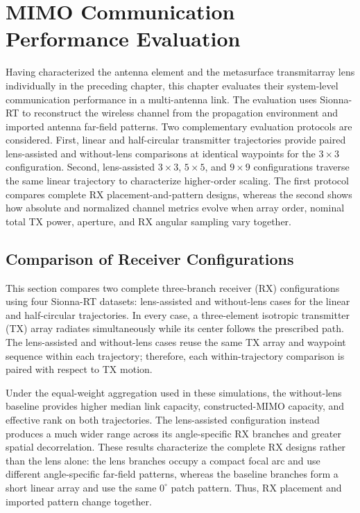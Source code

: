 \chapter{MIMO Communication Performance Evaluation}

Having characterized the antenna element and the metasurface transmitarray lens individually in the preceding chapter, this chapter evaluates their system-level communication performance in a multi-antenna link. The evaluation uses Sionna-RT to reconstruct the wireless channel from the propagation environment and imported antenna far-field patterns. Two complementary evaluation protocols are considered. First, linear and half-circular transmitter trajectories provide paired lens-assisted and without-lens comparisons at identical waypoints for the $3\times3$ configuration. Second, lens-assisted $3\times3$, $5\times5$, and $9\times9$ configurations traverse the same linear trajectory to characterize higher-order scaling. The first protocol compares complete RX placement-and-pattern designs, whereas the second shows how absolute and normalized channel metrics evolve when array order, nominal total TX power, aperture, and RX angular sampling vary together.

\section{Comparison of Receiver Configurations}\label{sec:comparison-antenna-placements}

This section compares two complete three-branch receiver (RX) configurations using four Sionna-RT datasets: lens-assisted and without-lens cases for the linear and half-circular trajectories. In every case, a three-element isotropic transmitter (TX) array radiates simultaneously while its center follows the prescribed path. The lens-assisted and without-lens cases reuse the same TX array and waypoint sequence within each trajectory; therefore, each within-trajectory comparison is paired with respect to TX motion.

Under the equal-weight aggregation used in these simulations, the without-lens baseline provides higher median link capacity, constructed-MIMO capacity, and effective rank on both trajectories. The lens-assisted configuration instead produces a much wider range across its angle-specific RX branches and greater spatial decorrelation. These results characterize the complete RX designs rather than the lens alone: the lens branches occupy a compact focal arc and use different angle-specific far-field patterns, whereas the baseline branches form a short linear array and use the same $0^\circ$ patch pattern. Thus, RX placement and imported pattern change together.


